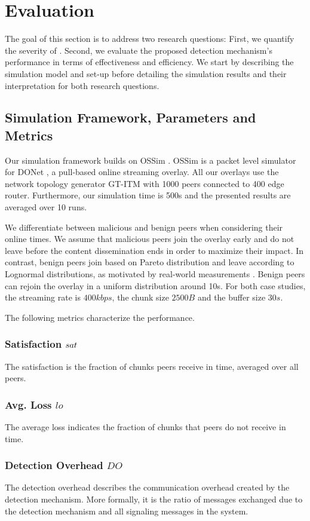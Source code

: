 \section{Evaluation}
\label{sec:eval}

The goal of this section is to address two research questions: 
First, we quantify the severity of \drop. 
Second, we evaluate the proposed detection mechanism's performance in terms of effectiveness and efficiency. 
We start by describing the simulation model and set-up before detailing the simulation results and their interpretation for both research questions.


\subsection{Simulation Framework, Parameters and Metrics}
Our simulation framework builds on OSSim \cite{nguyen2013ossim}. 
OSSim is a packet level simulator for DONet \cite{zhang2005coolstreaming}, a pull-based online streaming overlay.
All our overlays use the network topology generator GT-ITM \cite{GT} with 1000 peers connected to 400 edge router. Furthermore, our simulation time is 500s and the presented results are averaged over 10 runs. 

We differentiate between malicious and benign peers when considering their online times. 
We assume that malicious peers join the overlay early and do not leave before the content dissemination ends in order to maximize their impact. 
In contrast,  benign peers join based on Pareto distribution and leave according to Lognormal distributions, as motivated by real-world measurements \cite{distribution}.
Benign peers can rejoin the overlay in a uniform distribution around 10s. For both case studies, the streaming rate is $400kbps$, the chunk size $2500B$ and the buffer size $30s$.


The following metrics characterize the performance.
\subsubsection*{Satisfaction $sat$} The satisfaction is the fraction of chunks peers receive in time, averaged over all peers. 
\subsubsection*{Avg. Loss $lo$} The average loss indicates the fraction of chunks that peers do not receive in time. 
\subsubsection*{Detection Overhead $DO$} The detection overhead describes the communication overhead created by the detection mechanism. More formally, it is the ratio of messages exchanged due to the detection mechanism and all signaling messages in the system.
